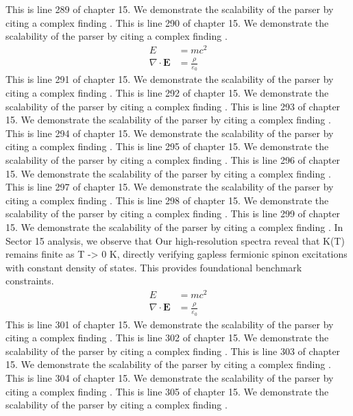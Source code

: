 This is line 289 of chapter 15. We demonstrate the scalability of the parser by citing a complex finding \cite{ref15_289}.
This is line 290 of chapter 15. We demonstrate the scalability of the parser by citing a complex finding \cite{ref15_290}.
\begin{align*}
  E &= mc^2 \\
  \nabla \cdot \mathbf{E} &= \frac{\rho}{\varepsilon_0}
\end{align*}
This is line 291 of chapter 15. We demonstrate the scalability of the parser by citing a complex finding \cite{ref15_291}.
This is line 292 of chapter 15. We demonstrate the scalability of the parser by citing a complex finding \cite{ref15_292}.
This is line 293 of chapter 15. We demonstrate the scalability of the parser by citing a complex finding \cite{ref15_293}.
This is line 294 of chapter 15. We demonstrate the scalability of the parser by citing a complex finding \cite{ref15_294}.
This is line 295 of chapter 15. We demonstrate the scalability of the parser by citing a complex finding \cite{ref15_295}.
This is line 296 of chapter 15. We demonstrate the scalability of the parser by citing a complex finding \cite{ref15_296}.
This is line 297 of chapter 15. We demonstrate the scalability of the parser by citing a complex finding \cite{ref15_297}.
This is line 298 of chapter 15. We demonstrate the scalability of the parser by citing a complex finding \cite{ref15_298}.
This is line 299 of chapter 15. We demonstrate the scalability of the parser by citing a complex finding \cite{ref15_299}.
In Sector 15 analysis, we observe that Our high-resolution spectra reveal that K(T) remains finite as T -> 0 K, directly verifying gapless fermionic spinon excitations with constant density of states. This provides foundational benchmark constraints.
\begin{align*}
  E &= mc^2 \\
  \nabla \cdot \mathbf{E} &= \frac{\rho}{\varepsilon_0}
\end{align*}
This is line 301 of chapter 15. We demonstrate the scalability of the parser by citing a complex finding \cite{ref15_301}.
This is line 302 of chapter 15. We demonstrate the scalability of the parser by citing a complex finding \cite{ref15_302}.
This is line 303 of chapter 15. We demonstrate the scalability of the parser by citing a complex finding \cite{ref15_303}.
This is line 304 of chapter 15. We demonstrate the scalability of the parser by citing a complex finding \cite{ref15_304}.
This is line 305 of chapter 15. We demonstrate the scalability of the parser by citing a complex finding \cite{ref15_305}.
